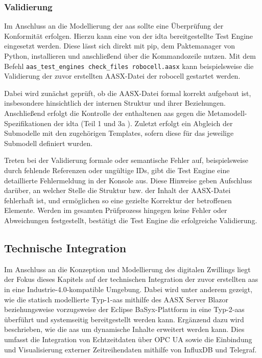 \subsubsection{Validierung}
Im Anschluss an die Modellierung der \acs{aas} sollte eine Überprüfung der Konformität erfolgen.
Hierzu kann eine von der \acs{idta} bereitgestellte Test Engine \cite{TestEngine} eingesetzt werden. 
Diese lässt sich direkt mit pip, dem Paktemanager von Python, installieren und anschließend über die Kommandozeile nutzen.
Mit dem Befehl \verb|aas_test_engines check_files robocell.aasx| kann beispielsweise die Validierung der zuvor erstellten AASX-Datei der robocell gestartet werden.

Dabei wird zunächst geprüft, ob die AASX-Datei formal korrekt aufgebaut ist, insbesondere hinsichtlich der internen Struktur und ihrer Beziehungen.
Anschließend erfolgt die Kontrolle der enthaltenen \acs{aas} gegen die Metamodell-Spezifikationen der \acs{idta} (Teil 1 \cite{SpezifikationPart1} und 3a \cite{SpezifikationPart3a}).
Zuletzt erfolgt ein Abgleich der Submodelle mit den zugehörigen Templates, sofern diese für das jeweilige Submodell definiert wurden.

Treten bei der Validierung formale oder semantische Fehler auf, beispielsweise durch fehlende Referenzen oder ungültige IDs, gibt die Test Engine eine detaillierte Fehlermeldung in der Konsole aus. 
Diese Hinweise geben Aufschluss darüber, an welcher Stelle die Struktur bzw. der Inhalt der AASX-Datei fehlerhaft ist, und ermöglichen so eine gezielte Korrektur der betroffenen Elemente. 
Werden im gesamten Prüfprozess hingegen keine Fehler oder Abweichungen festgestellt, bestätigt die Test Engine die erfolgreiche Validierung.

\newpage
\subsection{Technische Integration}
Im Anschluss an die Konzeption und Modellierung des digitalen Zwillings liegt der Fokus dieses Kapitels auf der technischen Integration der zuvor erstellten \acs{aas} in eine Industrie-4.0-kompatible Umgebung.
Dabei wird unter anderem gezeigt, wie die statisch modellierte Typ-1-\acs{aas} mithilfe des AASX Server Blazor beziehungsweise vorzugsweise der Eclipse BaSyx-Plattform in eine Typ-2-\acs{aas} überführt und systemseitig bereitgestellt werden kann.
Ergänzend dazu wird beschrieben, wie die \acs{aas} um dynamische Inhalte erweitert werden kann.
Dies umfasst die Integration von Echtzeitdaten über OPC UA sowie die Einbindung und Visualisierung externer Zeitreihendaten mithilfe von InfluxDB und Telegraf.

